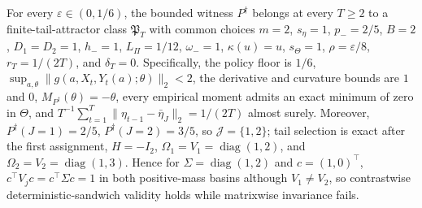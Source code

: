 For every \(\varepsilon\in(0,1/6)\), the bounded witness \(P^{\dagger}\) belongs at every \(T\ge2\) to a finite-tail-attractor class \(\mathfrak P_T\) with common choices \(m=2\), \(s_\eta=1\), \(p_-=2/5\), \(B=2\), \(D_1=D_2=1\), \(h_-=1\), \(L_\Pi=1/12\), \(\omega_-=1\), \(\kappa(u)=u\), \(s_\Theta=1\), \(\rho=\varepsilon/8\), \(r_T=1/(2T)\), and \(\delta_T=0\). Specifically, the policy floor is \(1/6\), \(\sup_{a,\theta}\|g(a,X_t,Y_t(a);\theta)\|_2<2\), the derivative and curvature bounds are \(1\) and \(0\), \(M_{P^{\dagger}}(\theta)=-\theta\), every empirical moment admits an exact minimum of zero in \(\Theta\), and \(T^{-1}\sum_{t=1}^T\|\eta_{t-1}-\bar\eta_J\|_2=1/(2T)\) almost surely. Moreover, \(P^{\dagger}(J=1)=2/5\), \(P^{\dagger}(J=2)=3/5\), so \(\mathcal J=\{1,2\}\); tail selection is exact after the first assignment, \(H=-I_2\), \(\Omega_1=V_1=\operatorname{diag}(1,2)\), and \(\Omega_2=V_2=\operatorname{diag}(1,3)\). Hence for \(\Sigma=\operatorname{diag}(1,2)\) and \(c=(1,0)^\top\), \(c^\top V_jc=c^\top\Sigma c=1\) in both positive-mass basins although \(V_1\ne V_2\), so contrastwise deterministic-sandwich validity holds while matrixwise invariance fails.